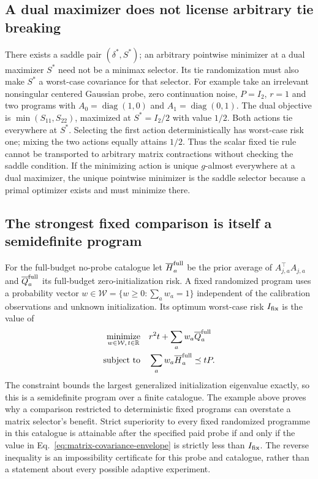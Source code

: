 \subsection{A dual maximizer does not license arbitrary tie breaking}
There exists a saddle pair $(\delta^*,S^*)$; an arbitrary pointwise minimizer at a dual maximizer $S^*$ need not be a minimax selector.
Its tie randomization must also make $S^*$ a worst-case covariance for that selector.
For example take an irrelevant nonsingular centered Gaussian probe, zero continuation noise, $P=I_2$, $r=1$ and two programs with $A_0=\operatorname{diag}(1,0)$ and $A_1=\operatorname{diag}(0,1)$.
The dual objective is $\min(S_{11},S_{22})$, maximized at $S^*=I_2/2$ with value $1/2$.
Both actions tie everywhere at $S^*$.
Selecting the first action deterministically has worst-case risk one; mixing the two actions equally attains $1/2$.
Thus the scalar fixed tie rule cannot be transported to arbitrary matrix contractions without checking the saddle condition.
If the minimizing action is unique $g$-almost everywhere at a dual maximizer, the unique pointwise minimizer is the saddle selector because a primal optimizer exists and must minimize there.

\subsection{The strongest fixed comparison is itself a semidefinite program}
For the full-budget no-probe catalogue let $\overline H_a^{\rm full}$ be the prior average of $A_{j,a}^\top A_{j,a}$ and $\overline Q_a^{\rm full}$ its full-budget zero-initialization risk.
A fixed randomized program uses a probability vector $w\in\mathcal W=\{w\ge0:\sum_aw_a=1\}$ independent of the calibration observations and unknown initialization.
Its optimum worst-case risk $I_{\rm fix}$ is the value of
\begin{equation}
\begin{aligned}
\underset{w\in\mathcal W,\,t\in\mathbb R}{\operatorname{minimize}}\quad
&r^2t+\sum_aw_a\overline Q_a^{\rm full}\\
\text{subject to}\quad&\sum_aw_a\overline H_a^{\rm full}\preceq tP.
\end{aligned}
\label{eq:matrix-fixed-SDP}
\end{equation}
The constraint bounds the largest generalized initialization eigenvalue exactly, so this is a semidefinite program over a finite catalogue.
The example above proves why a comparison restricted to deterministic fixed programs can overstate a matrix selector's benefit.
Strict superiority to every fixed randomized programme in this catalogue is attainable after the specified paid probe if and only if the value in Eq.~\eqref{eq:matrix-covariance-envelope} is strictly less than $I_{\rm fix}$.
The reverse inequality is an impossibility certificate for this probe and catalogue, rather than a statement about every possible adaptive experiment.

